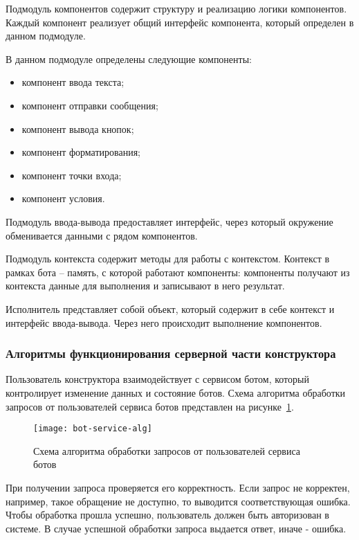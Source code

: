 Подмодуль компонентов содержит структуру и реализацию логики
компонентов. Каждый компонент реализует общий интерфейс компонента,
который определен в данном подмодуле.

В данном подмодуле определены следующие компоненты:
\begin{itemize}
	\item 	компонент ввода текста;
	\item 	компонент отправки сообщения;
	\item 	компонент вывода кнопок;
	\item 	компонент форматирования;
	\item 	компонент точки входа;
	\item 	компонент условия.
\end{itemize}

Подмодуль ввода-вывода предоставляет интерфейс, через который
окружение обменивается данными с рядом компонентов.

Подмодуль контекста содержит методы для работы с контекстом.
Контекст в рамках бота – память, с которой работают компоненты:
компоненты получают из контекста данные для выполнения и записывают в
него результат.

Исполнитель представляет собой объект, который содержит в себе
контекст и интерфейс ввода-вывода. Через него происходит выполнение
компонентов.


\subsubsection{Алгоритмы функционирования серверной части конструктора}

Пользователь конструктора взаимодействует с сервисом ботом, который
контролирует изменение данных и состояние ботов.
Схема алгоритма обработки запросов от пользователей сервиса ботов
представлен на рисунке~\ref{f:bot-service-alg}.

\begin{figure}[hp]
	\centering
	\texttt{[image: bot-service-alg]}
	\caption{Схема алгоритма обработки запросов от пользователей сервиса ботов}
	\label{f:bot-service-alg}
\end{figure}

При получении запроса проверяется его корректность.
Если запрос не корректен, например, такое обращение не доступно, то
выводится соответствующая ошибка. Чтобы обработка прошла успешно, пользователь
должен быть авторизован в системе. В случае успешной обработки запроса выдается
ответ, иначе - ошибка.



